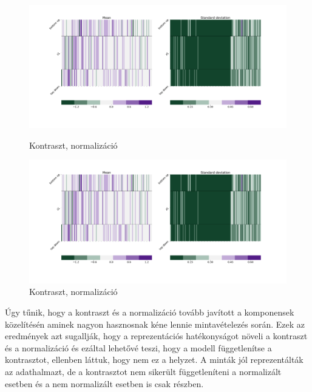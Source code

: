 \documentclass[12pt, english]{article}
\begin{document}
\begin{figure}[H]
  \begin{minipage}{0.5\linewidth}
    \centering
    \includegraphics[width=.75\linewidth]{z1_vis/z1_vis_norm_contrast/16_DenseLinLinLadderVAE_textures_contrastNorm_contrast-stats-1_vector_comparisons_1.png}
    \caption{Kontraszt, normalizáció}
    \label{fig:sample-norm-contrast-1}
  \end{minipage}
  \begin{minipage}{0.5\linewidth}
    \centering
    \includegraphics[width=.75\linewidth]{z1_vis/z1_vis_norm_contrast/16_DenseLinLinLadderVAE_textures_contrastNorm_contrast-stats-1_vector_comparisons_1.png}
    \caption{Kontraszt, normalizáció}
    \label{fig:sample-norm-contrast-2}
  \end{minipage}
\end{figure}

\vspace{4mm}

\par Úgy tűnik, hogy a kontraszt és a normalizáció tovább javított a komponensek közelítésén aminek nagyon hasznosnak kéne lennie mintavételezés során. Ezek az eredmények azt sugallják, hogy a reprezentációs hatékonyságot növeli a kontraszt és a normalizáció és ezáltal lehetővé teszi, hogy a modell függetlenítse a kontrasztot, ellenben láttuk, hogy nem ez a helyzet. A minták jól reprezentálták az adathalmazt, de a kontrasztot nem sikerült függetleníteni a normalizált esetben és a nem normalizált esetben is csak részben.

\vspace{4mm}
\end{document}
